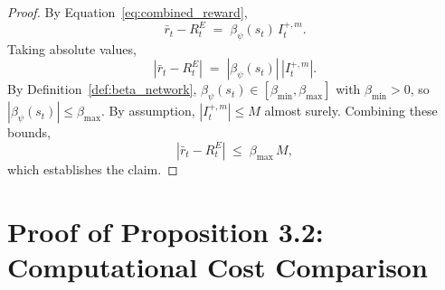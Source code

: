 \begin{proof}
By Equation~\eqref{eq:combined_reward},
\begin{equation*}
\bar r_t - R_t^E \;=\; \beta_\psi(s_t)\, I_t^{+,m}.
\end{equation*}
Taking absolute values,
\begin{equation*}
\left| \bar r_t - R_t^E \right| \;=\; \left| \beta_\psi(s_t) \right|\, \left| I_t^{+,m} \right|.
\end{equation*}
By Definition~\ref{def:beta_network}, $\beta_\psi(s_t) \in [\beta_\text{min}, \beta_\text{max}]$ with $\beta_\text{min} > 0$, so $|\beta_\psi(s_t)| \le \beta_\text{max}$. By assumption, $|I_t^{+,m}| \le M$ almost surely. Combining these bounds,
\begin{equation*}
\left| \bar r_t - R_t^E \right| \;\le\; \beta_\text{max}\, M,
\end{equation*}
which establishes the claim.
\end{proof}

\section{Proof of Proposition 3.2: Computational Cost Comparison}
\label{app:proof_cost}

